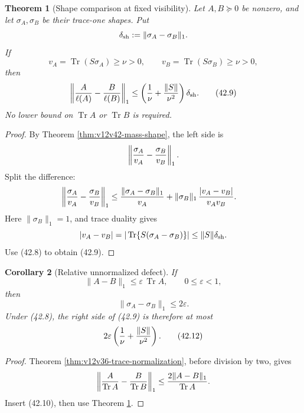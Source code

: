 \documentclass[11pt]{article}
\newtheorem{theorem}{Theorem}[section]
\newtheorem{corollary}[theorem]{Corollary}
\theoremstyle{remark}
\begin{document}
\begin{theorem}[Shape comparison at fixed visibility]
\label{thm:v12v42-shape-comparison}
Let \(A,B\succeq0\) be nonzero, and let
\(\sigma_A,\sigma_B\) be their trace-one shapes.  Put
\[
 \delta_{\rm sh}:=\|\sigma_A-\sigma_B\|_1.
\]
If
\begin{equation}
 v_A=\operatorname{Tr}(S\sigma_A)\geq\nu>0,\qquad
 v_B=\operatorname{Tr}(S\sigma_B)\geq\nu>0,       \tag{42.8}
\end{equation}
then
\begin{equation}
 \left\|
 {A\over\ell(A)}-{B\over\ell(B)}
 \right\|_1
 \leq
 \left({1\over\nu}+{\|S\|\over\nu^2}\right)
 \delta_{\rm sh}.                                 \tag{42.9}
\end{equation}
No lower bound on \(\operatorname{Tr}A\) or
\(\operatorname{Tr}B\) is required.
\end{theorem}

\begin{proof}
By Theorem \ref{thm:v12v42-mass-shape}, the left side is
\[
 \left\|{\sigma_A\over v_A}
              -{\sigma_B\over v_B}\right\|_1.
\]
Split the difference:
\begin{align*}
 \left\|{\sigma_A\over v_A}
              -{\sigma_B\over v_B}\right\|_1
 &\leq
 {\|\sigma_A-\sigma_B\|_1\over v_A}
 +
 \|\sigma_B\|_1\,{|v_A-v_B|\over v_Av_B}.
\end{align*}
Here \(\|\sigma_B\|_1=1\), and trace duality gives
\[
 |v_A-v_B|
 =
 |\operatorname{Tr}\{S(\sigma_A-\sigma_B)\}|
 \leq\|S\|\delta_{\rm sh}.
\]
Use (42.8) to obtain (42.9).
\end{proof}

\begin{corollary}[Relative unnormalized defect]
\label{cor:v12v42-relative-defect}
If
\begin{equation}
 \|A-B\|_1\leq\varepsilon\,\operatorname{Tr}A,
 \qquad 0\leq\varepsilon<1,                      \tag{42.10}
\end{equation}
then
\begin{equation}
 \|\sigma_A-\sigma_B\|_1\leq2\varepsilon.         \tag{42.11}
\end{equation}
Under (42.8), the right side of (42.9) is therefore at most
\[
 2\varepsilon
 \left({1\over\nu}+{\|S\|\over\nu^2}\right).      \tag{42.12}
\]
\end{corollary}

\begin{proof}
Theorem \ref{thm:v12v36-trace-normalization}, before division by two,
gives
\[
 \left\|{A\over\operatorname{Tr}A}
       -{B\over\operatorname{Tr}B}\right\|_1
 \leq
 {2\|A-B\|_1\over\operatorname{Tr}A}.
\]
Insert (42.10), then use Theorem
\ref{thm:v12v42-shape-comparison}.
\end{proof}
\end{document}

